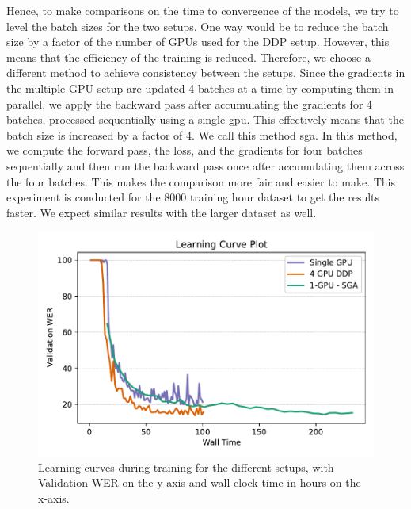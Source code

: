 Hence, to make comparisons on the time to convergence of the models, we try to level the batch sizes for the two setups. One way would be to reduce the batch size by a factor of the number of GPUs used for the DDP setup. However, this means that the efficiency of the training is reduced. Therefore, we choose a different method to achieve consistency between the setups. Since the gradients in the multiple GPU setup are updated 4 batches at a time by computing them in parallel, we apply the backward pass after accumulating the gradients for 4 batches, processed sequentially using a single \acrshort{gpu}. This effectively means that the batch size is increased by a factor of 4. We call this method \acrfull{sga}. In this method, we compute the forward pass, the loss, and the gradients for four batches sequentially and then run the backward pass once after accumulating them across the four batches. This makes the comparison more fair and easier to make. This experiment is conducted for the 8000 training hour dataset to get the results faster. We expect similar results with the larger dataset as well. 

\begin{figure}[ht]
  \begin{center}
    \includegraphics[width=\textwidth]{images/learning_curve_8000.pdf} 
    \caption{Learning curves during training for the different setups, with Validation WER on the y-axis and wall clock time in hours on the x-axis.}
    \label{fig:learningcurve_ddp}
  \end{center}
\end{figure}


